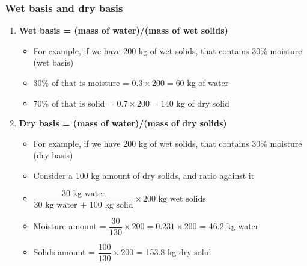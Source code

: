 \begin{frame}\frametitle{Wet basis and dry basis}
	\begin{enumerate}
		\item	{\color{myOrange}\textbf{Wet basis = (mass of water)/(mass of wet solids)}}
		\begin{itemize}
			\item	For example, if we have 200 kg of wet solids, that contains 30\% moisture (wet basis)
			\item	30\% of that is moisture = $0.3 \times 200 = 60$ kg of water
			\item	70\% of that is solid = $0.7 \times 200 = 140$ kg of dry solid
		\end{itemize}

		\vspace{12pt}
		\item	{\color{myOrange}\textbf{Dry basis = (mass of water)/(mass of dry solids)}}
		\begin{itemize}
			\item	For example, if we have 200 kg of wet solids, that contains 30\% moisture (dry basis)
			\item	Consider a 100 kg amount of {\color{red} dry} solids, and ratio against it

			\item	$\dfrac{\text{30 kg water}}{\text{30 kg water + 100 kg solid}} \times \text{200 kg wet solids}$
			\item	Moisture amount = $\dfrac{30}{130} \times 200 = 0.231 \times 200$ = 46.2 kg water
			\item	Solids amount = $\dfrac{100}{130} \times 200$ = 153.8 kg dry solid
		\end{itemize}
		
		
	\end{enumerate}
\end{frame}

